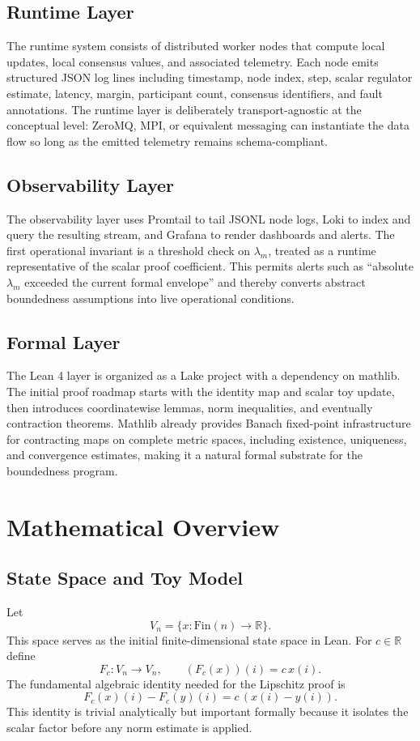 \documentclass[11pt]{article}
\begin{document}
\subsection{Runtime Layer}
The runtime system consists of distributed worker nodes that compute local updates, local consensus values, and associated telemetry. Each node emits structured JSON log lines including timestamp, node index, step, scalar regulator estimate, latency, margin, participant count, consensus identifiers, and fault annotations. The runtime layer is deliberately transport-agnostic at the conceptual level: ZeroMQ, MPI, or equivalent messaging can instantiate the data flow so long as the emitted telemetry remains schema-compliant.

\subsection{Observability Layer}
The observability layer uses Promtail to tail JSONL node logs, Loki to index and query the resulting stream, and Grafana to render dashboards and alerts. The first operational invariant is a threshold check on $\lambda_m$, treated as a runtime representative of the scalar proof coefficient. This permits alerts such as ``absolute $\lambda_m$ exceeded the current formal envelope'' and thereby converts abstract boundedness assumptions into live operational conditions.

\subsection{Formal Layer}
The Lean 4 layer is organized as a Lake project with a dependency on mathlib. The initial proof roadmap starts with the identity map and scalar toy update, then introduces coordinatewise lemmas, norm inequalities, and eventually contraction theorems. Mathlib already provides Banach fixed-point infrastructure for contracting maps on complete metric spaces, including existence, uniqueness, and convergence estimates, making it a natural formal substrate for the boundedness program.
\newpage
\section{Mathematical Overview}

\subsection{State Space and Toy Model}
Let
\[
V_n = \{x : \mathrm{Fin}(n) \to \mathbb{R}\}. \tag{3}
\]
This space serves as the initial finite-dimensional state space in Lean. For $c \in \mathbb{R}$ define
\[
F_c : V_n \to V_n, \qquad (F_c(x))(i) = c\,x(i). \tag{4}
\]
The fundamental algebraic identity needed for the Lipschitz proof is
\[
F_c(x)(i) - F_c(y)(i) = c\,(x(i)-y(i)). \tag{5}
\]
This identity is trivial analytically but important formally because it isolates the scalar factor before any norm estimate is applied.
\end{document}

